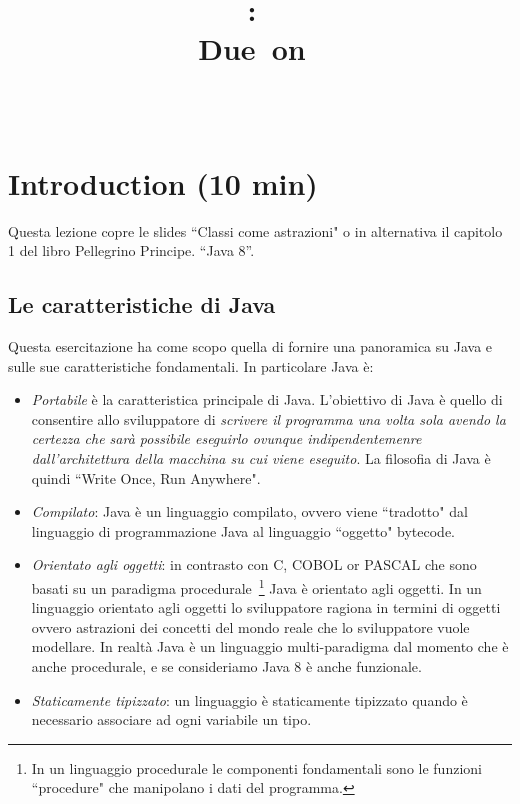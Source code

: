 \documentclass{article}
\title{
\vspace{2in}
\textmd{\textbf{\hmwkClass:\ \hmwkTitle}}\\
\normalsize\vspace{0.1in}\small{Due\ on\ \hmwkDueDate}\\
\vspace{0.1in}\large{\textit{\hmwkClassInstructor\ \hmwkClassTime}}
\vspace{3in}
}
\author{\textbf{\hmwkAuthorName}}
\date{} %
\theoremstyle{definition}
\begin{document}
\maketitle



\newpage
\tableofcontents
\newpage



\section{Introduction (10 min)}
Questa lezione copre le  slides ``Classi come astrazioni" o in alternativa il capitolo  1 del libro  Pellegrino Principe. “Java 8”.


\subsection{Le caratteristiche di Java}
Questa esercitazione ha come scopo quella di fornire una panoramica su Java e sulle sue caratteristiche fondamentali. In particolare Java \`e:
\begin{itemize}
\item \emph{Portabile} \`e la caratteristica principale di Java. L'obiettivo di Java \`e quello di consentire allo sviluppatore di  \emph{scrivere il programma una volta sola avendo la certezza che sar\`a possibile eseguirlo ovunque indipendentemenre dall'architettura della macchina su cui viene eseguito}. La filosofia di Java \`e quindi ``Write Once, Run Anywhere".
\item \emph{Compilato}: Java \`e un linguaggio compilato, ovvero viene ``tradotto" dal linguaggio di programmazione Java al linguaggio ``oggetto" bytecode. 
\item \emph{Orientato agli oggetti}: in contrasto con C, COBOL or PASCAL che sono basati su un paradigma procedurale~\footnote{In un linguaggio procedurale le componenti fondamentali sono le funzioni ``procedure" che manipolano i dati del programma.} Java \`e orientato agli oggetti. In un linguaggio orientato agli oggetti lo sviluppatore ragiona in termini di oggetti ovvero astrazioni dei concetti del mondo reale che lo sviluppatore vuole modellare. In realt\`a Java \`e un linguaggio multi-paradigma dal momento che \`e anche procedurale, e se consideriamo Java 8 \`e anche funzionale.
\item \emph{Staticamente tipizzato}: un linguaggio \`e staticamente tipizzato quando \`e necessario associare ad ogni variabile un tipo.
\end{itemize}
\end{document}
